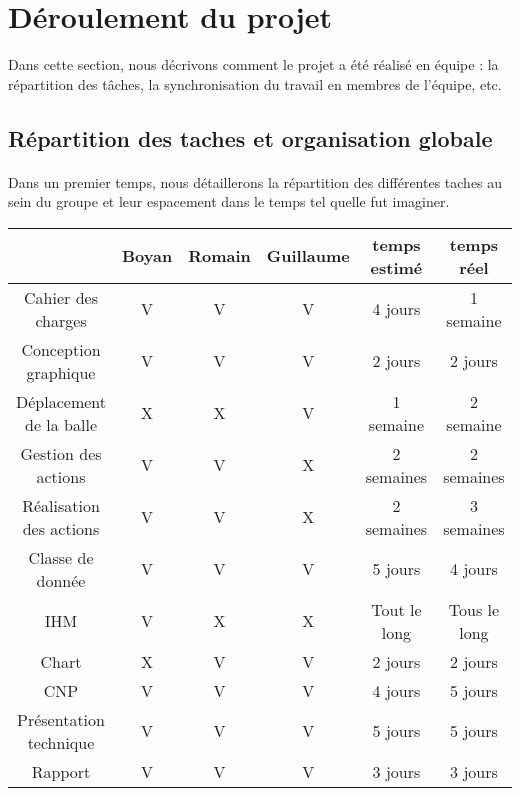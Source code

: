 \newpage
\section{Déroulement du projet}
\label{sec:deroulement}

Dans cette section, nous décrivons comment le projet a été réalisé en équipe : la répartition des tâches, la synchronisation du travail en membres de l'équipe, etc.

\subsection{Répartition des taches et organisation globale}

\paragraph{}
    Dans un premier temps, nous détaillerons la répartition des différentes taches au sein du groupe et leur espacement dans le temps tel quelle fut imaginer.

\begin{center}
\begin{tabular}{ |c|c|c|c|c|c| } 
 \hline
   & Boyan & Romain & Guillaume & temps estimé & temps réel\\ 
 \hline\hline
   Cahier des charges & V & V & V & 4 jours &1 semaine\\ 
 \hline
  Conception graphique & V & V & V & 2 jours & 2 jours\\ 
 \hline
 Déplacement de la balle & X & X & V & 1 semaine & 2 semaine\\ 
 \hline
 Gestion des actions & V & V & X & 2 semaines &2 semaines\\
 \hline
 Réalisation des actions & V & V & X & 2 semaines & 3 semaines\\
 \hline
 Classe de donnée & V & V & V & 5 jours & 4 jours\\
 \hline
 IHM & V & X & X & Tout le long & Tous le long\\
 \hline
  Chart & X & V & V & 2 jours & 2 jours\\
 \hline
   CNP & V & V & V & 4 jours & 5 jours\\
 \hline
    Présentation technique & V & V & V & 5 jours & 5 jours\\
 \hline
 Rapport & V & V & V & 3 jours & 3 jours\\  
 \hline
\end{tabular}
\end{center}

